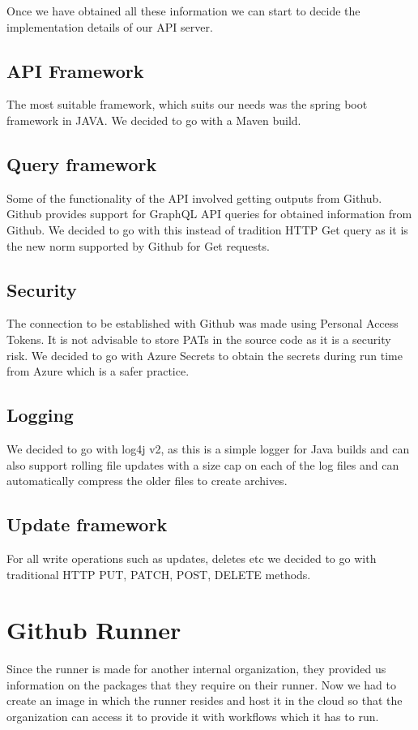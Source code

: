 Once we have obtained all these information we can start to decide the implementation details of our API server.

\subsection{API Framework}
The most suitable framework, which suits our needs was the spring boot framework in JAVA. We decided to go with a Maven build.


\subsection{Query framework}
Some of the functionality of the API involved getting outputs from Github. Github provides support for GraphQL API queries for obtained information from Github. We decided to go with this instead of tradition HTTP Get query as it is the new norm supported by Github for Get requests.

\subsection{Security}
The connection to be established with Github was made using Personal Access Tokens. It is not advisable to store PATs in the source code as it is a security risk. We decided to go with Azure Secrets to obtain the secrets during run time from Azure which is a safer practice.

\subsection{Logging}
We decided to go with log4j v2, as this is a simple logger for Java builds and can also support rolling file updates with a size cap on each of the log files and can automatically compress the older files to create archives.

\subsection{Update framework}
For all write operations such as updates, deletes etc we decided to go with traditional HTTP PUT, PATCH, POST, DELETE methods.

\section{Github Runner}
Since the runner is made for another internal organization, they provided us information on the packages that they require on their runner. Now we had to create an image in which the runner resides and host it in the cloud so that the organization can access it to provide it with workflows which it has to run.

